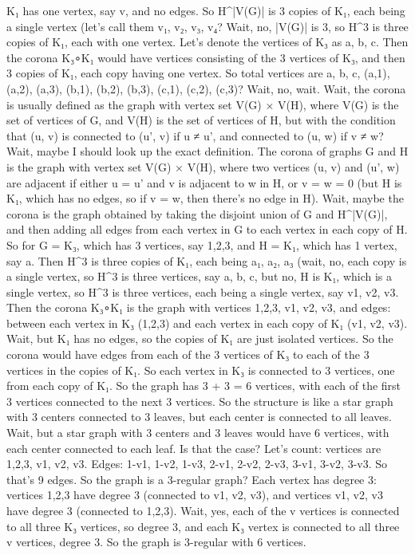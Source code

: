 K₁ has one vertex, say v, and no edges. So H^|V(G)| is 3 copies of K₁, each being a single vertex (let's call them v₁, v₂, v₃, v₄? Wait, no, |V(G)| is 3, so H^3 is three copies of K₁, each with one vertex. Let's denote the vertices of K₃ as a, b, c. Then the corona K₃∘K₁ would have vertices consisting of the 3 vertices of K₃, and then 3 copies of K₁, each copy having one vertex. So total vertices are a, b, c, (a,1), (a,2), (a,3), (b,1), (b,2), (b,3), (c,1), (c,2), (c,3)? Wait, no, wait. Wait, the corona is usually defined as the graph with vertex set V(G) × V(H), where V(G) is the set of vertices of G, and V(H) is the set of vertices of H, but with the condition that (u, v) is connected to (u', v) if u ≠ u', and connected to (u, w) if v ≠ w? Wait, maybe I should look up the exact definition. The corona of graphs G and H is the graph with vertex set V(G) × V(H), where two vertices (u, v) and (u', w) are adjacent if either u = u' and v is adjacent to w in H, or v = w = 0 (but H is K₁, which has no edges, so if v = w, then there's no edge in H). Wait, maybe the corona is the graph obtained by taking the disjoint union of G and H^|V(G)|, and then adding all edges from each vertex in G to each vertex in each copy of H. So for G = K₃, which has 3 vertices, say {1,2,3}, and H = K₁, which has 1 vertex, say {a}. Then H^3 is three copies of K₁, each being {a₁, a₂, a₃} (wait, no, each copy is a single vertex, so H^3 is three vertices, say a, b, c, but no, H is K₁, which is a single vertex, so H^3 is three vertices, each being a single vertex, say v1, v2, v3. Then the corona K₃∘K₁ is the graph with vertices {1,2,3, v1, v2, v3}, and edges: between each vertex in K₃ (1,2,3) and each vertex in each copy of K₁ (v1, v2, v3). Wait, but K₁ has no edges, so the copies of K₁ are just isolated vertices. So the corona would have edges from each of the 3 vertices of K₃ to each of the 3 vertices in the copies of K₁. So each vertex in K₃ is connected to 3 vertices, one from each copy of K₁. So the graph has 3 + 3 = 6 vertices, with each of the first 3 vertices connected to the next 3 vertices. So the structure is like a star graph with 3 centers connected to 3 leaves, but each center is connected to all leaves. Wait, but a star graph with 3 centers and 3 leaves would have 6 vertices, with each center connected to each leaf. Is that the case? Let's count: vertices are 1,2,3, v1, v2, v3. Edges: 1-v1, 1-v2, 1-v3, 2-v1, 2-v2, 2-v3, 3-v1, 3-v2, 3-v3. So that's 9 edges. So the graph is a 3-regular graph? Each vertex has degree 3: vertices 1,2,3 have degree 3 (connected to v1, v2, v3), and vertices v1, v2, v3 have degree 3 (connected to 1,2,3). Wait, yes, each of the v vertices is connected to all three K₃ vertices, so degree 3, and each K₃ vertex is connected to all three v vertices, degree 3. So the graph is 3-regular with 6 vertices. 

